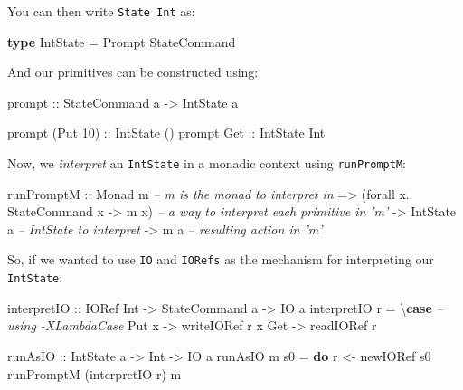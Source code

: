 \documentclass[]{article}
\newenvironment{Shaded}{}{}
\newcommand{\KeywordTok}[1]{\textcolor[rgb]{0.00,0.44,0.13}{\textbf{#1}}}
\newcommand{\DataTypeTok}[1]{\textcolor[rgb]{0.56,0.13,0.00}{#1}}
\newcommand{\DecValTok}[1]{\textcolor[rgb]{0.25,0.63,0.44}{#1}}
\newcommand{\CommentTok}[1]{\textcolor[rgb]{0.38,0.63,0.69}{\textit{#1}}}
\newcommand{\OtherTok}[1]{\textcolor[rgb]{0.00,0.44,0.13}{#1}}
\newcommand{\FunctionTok}[1]{\textcolor[rgb]{0.02,0.16,0.49}{#1}}
\newcommand{\NormalTok}[1]{#1}
\begin{document}
You can then write \texttt{State\ Int} as:

\begin{Shaded}
\begin{Highlighting}[]
\KeywordTok{type} \DataTypeTok{IntState} \FunctionTok{=} \DataTypeTok{Prompt} \DataTypeTok{StateCommand}
\end{Highlighting}
\end{Shaded}

And our primitives can be constructed using:

\begin{Shaded}
\begin{Highlighting}[]
\OtherTok{prompt ::} \DataTypeTok{StateCommand}\NormalTok{ a }\OtherTok{->} \DataTypeTok{IntState}\NormalTok{ a}

\NormalTok{prompt (}\DataTypeTok{Put} \DecValTok{10}\NormalTok{)}\OtherTok{ ::} \DataTypeTok{IntState}\NormalTok{ ()}
\NormalTok{prompt }\DataTypeTok{Get}\OtherTok{      ::} \DataTypeTok{IntState} \DataTypeTok{Int}
\end{Highlighting}
\end{Shaded}

Now, we \emph{interpret} an \texttt{IntState} in a monadic context using
\texttt{runPromptM}:

\begin{Shaded}
\begin{Highlighting}[]
\NormalTok{runPromptM}
\OtherTok{    ::} \DataTypeTok{Monad}\NormalTok{ m                              }\CommentTok{-- m is the monad to interpret in}
    \OtherTok{=>}\NormalTok{ (forall x}\FunctionTok{.} \DataTypeTok{StateCommand}\NormalTok{ x }\OtherTok{->}\NormalTok{ m x)    }\CommentTok{-- a way to interpret each primitive in 'm'}
    \OtherTok{->} \DataTypeTok{IntState}\NormalTok{ a                           }\CommentTok{-- IntState to interpret}
    \OtherTok{->}\NormalTok{ m a                                  }\CommentTok{-- resulting action in 'm'}
\end{Highlighting}
\end{Shaded}

So, if we wanted to use \texttt{IO} and \texttt{IORefs} as the mechanism for
interpreting our \texttt{IntState}:

\begin{Shaded}
\begin{Highlighting}[]
\NormalTok{interpretIO}
\OtherTok{    ::} \DataTypeTok{IORef} \DataTypeTok{Int}
    \OtherTok{->} \DataTypeTok{StateCommand}\NormalTok{ a}
    \OtherTok{->} \DataTypeTok{IO}\NormalTok{ a}
\NormalTok{interpretIO r }\FunctionTok{=}\NormalTok{ \textbackslash{}}\KeywordTok{case}           \CommentTok{-- using -XLambdaCase}
    \DataTypeTok{Put}\NormalTok{ x }\OtherTok{->}\NormalTok{ writeIORef r x}
    \DataTypeTok{Get}   \OtherTok{->}\NormalTok{ readIORef r}

\OtherTok{runAsIO ::} \DataTypeTok{IntState}\NormalTok{ a }\OtherTok{->} \DataTypeTok{Int} \OtherTok{->} \DataTypeTok{IO}\NormalTok{ a}
\NormalTok{runAsIO m s0 }\FunctionTok{=} \KeywordTok{do}
\NormalTok{    r }\OtherTok{<-}\NormalTok{ newIORef s0}
\NormalTok{    runPromptM (interpretIO r) m}
\end{Highlighting}
\end{Shaded}
\end{document}
